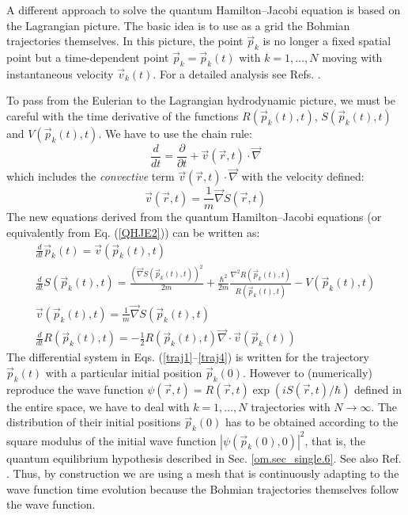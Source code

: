 \documentclass[onecolumn,nofootinbib, secnumarabic, amsmath, nobibnotes,11pt,aps,pra]{revtex4-1}
\newcommand{\sref}[1]{Sec. \ref{#1}}
\newcommand{\eref}[1]{Eq. (\ref{#1})}
\begin{document}
A different approach to solve the quantum Hamilton--Jacobi equation
is based on the Lagrangian picture. The basic idea is to use as a
grid the Bohmian trajectories themselves. In this picture, the point
$\vec{p}_k$ is no longer a fixed spatial point but a time-dependent
point $\vec{p}_k = \vec{p}_k(t)$ with $k = 1,\ldots,N$ moving with
instantaneous velocity $\vec{v}_k(t)$. For a detailed analysis see
Refs. \cite{om.Wyatt1, om.Wyatt2, om.Wyatt3, om.Frederick}.

To pass from the Eulerian to the Lagrangian hydrodynamic picture, we
must  be careful with the time derivative of the functions
$R(\vec{p}_{k}(t),t)$, $S(\vec{p}_{k}(t),t)$ and
$V(\vec{p}_{k}(t),t)$. We have to use the chain rule:
\begin{equation}
\frac{d}{dt} = \frac{\partial}{\partial t} + \vec v(\vec r,t)\cdot\vec{\nabla}
\end{equation}
which includes the \textit{convective} term \textit{$\vec{v}(\vec r,t)\cdot\vec{\nabla}$} with the velocity defined:
\begin{equation}
\vec{v}(\vec r,t) = \frac{1}{m}\vec{\nabla} S(\vec r,t)
\end{equation}
The new equations derived from the quantum Hamilton--Jacobi equations (or equivalently from \eref{QHJE2}) can be written as:
\begin{gather}
\frac{d}{dt}\vec{p}_k(t) = \vec{v}(\vec{p}_k(t),t)\label{traj1}\\[0.1in]
\frac{d}{dt}S(\vec{p}_k(t),t) = \frac{(\vec{\nabla} S(\vec{p}_k(t),t))^{2}}{2m} + \frac{\hbar^{2}%
}{2m}\frac{\nabla^{2}R(\vec{p}_k(t),t)}{R(\vec{p}_k(t),t)} - V(\vec{p}_k(t),t)\label{traj2}\\[0.1in]
\vec{v}(\vec{p}_k(t),t) = \frac{1}{m}\vec{\nabla} S(\vec{p}_k(t),t)\label{traj3}\\[0.1in]
\frac{d}{dt}R(\vec{p}_k(t),t) = -\frac{1}{2}R(\vec{p}_k(t),t)\vec{\nabla}\cdot\vec{v}(\vec
{p}_k(t))\label{traj4}%
\end{gather}
The differential system in Eqs. (\ref{traj1}--\ref{traj4}) is written for the trajectory $\vec{p}_k(t)$ with a particular initial position $\vec{p}_k(0)$. However to (numerically) reproduce the wave function $\psi(\vec r,t) = R(\vec r,t)\exp(iS(\vec r,t)/\hbar)$ defined in the entire space, we have to deal with $k = 1,\ldots,N$ trajectories with $N\rightarrow\infty$. The distribution of their initial positions $\vec{p}_k(0)$ has to be obtained according to the square modulus of the initial wave function $|\psi(\vec p_k(0),0)|^2$, that is, the quantum equilibrium hypothesis described in \sref{om.sec_single.6}. See also Ref. \cite{om.Holand1993}. Thus, by construction we are using a mesh that is continuously adapting to the wave function time evolution because the Bohmian trajectories themselves follow the wave function.
\end{document}
